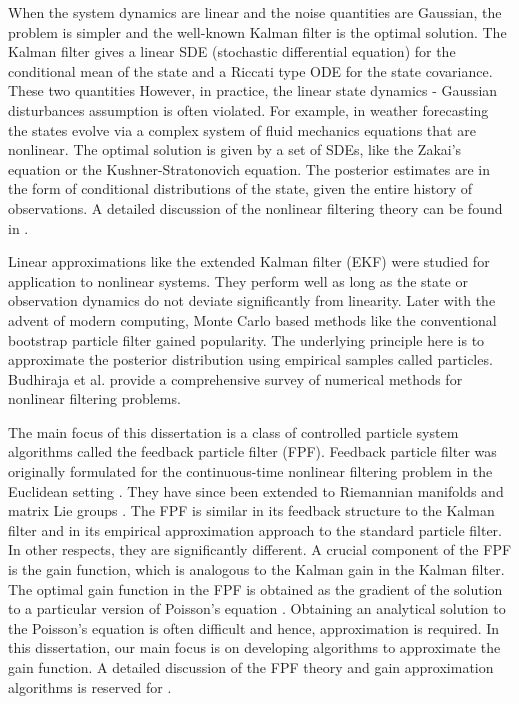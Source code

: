 When the system dynamics are linear and the noise quantities are Gaussian, the problem is simpler and the well-known Kalman filter is the optimal solution. The Kalman filter gives a linear SDE (stochastic differential equation) for the conditional mean of the state and a Riccati type ODE for the state covariance. These two quantities However, in practice, the linear state dynamics - Gaussian disturbances assumption is often violated.  For example, in weather forecasting the states evolve via a complex system of fluid mechanics equations that are nonlinear. The optimal solution is given by a set of SDEs, like the Zakai's equation or the Kushner-Stratonovich equation. The posterior estimates are in the form of conditional distributions of the state, given the entire history of observations. A detailed discussion of the nonlinear filtering theory can be found in \cite{baicri08}. 

Linear approximations like the extended Kalman filter (EKF) were studied for application to nonlinear systems. They perform well as long as the state or observation dynamics do not deviate significantly from linearity. Later with the advent of modern computing, Monte Carlo based methods like the conventional bootstrap particle filter gained popularity. The underlying principle here is to approximate the posterior distribution using empirical samples called particles. Budhiraja et al. \cite{budchelee07} provide a comprehensive survey of numerical methods for nonlinear filtering problems. 

The main focus of this dissertation is a class of controlled particle system algorithms called the feedback particle filter (FPF). Feedback particle filter was originally formulated for the continuous-time nonlinear filtering problem in the Euclidean setting \cite{yanmehmey13}. They have since been extended to Riemannian manifolds and matrix Lie groups \cite{zhatagmeh16}. The FPF is similar in its feedback structure to the Kalman filter and in its empirical approximation approach to the standard particle filter. In other respects, they are significantly different. A crucial component of the FPF is the gain function, which is analogous to the Kalman gain in the Kalman filter. The optimal gain function in the FPF is obtained as the gradient of the solution to a particular version of Poisson's equation \cite{yanmehmey13, laumehmeyrag14}. Obtaining an analytical solution to the Poisson's equation is often difficult and hence, approximation is required. In this dissertation, our main focus is on developing algorithms to approximate the gain function. A detailed discussion of the FPF theory and gain approximation algorithms is reserved for . 

